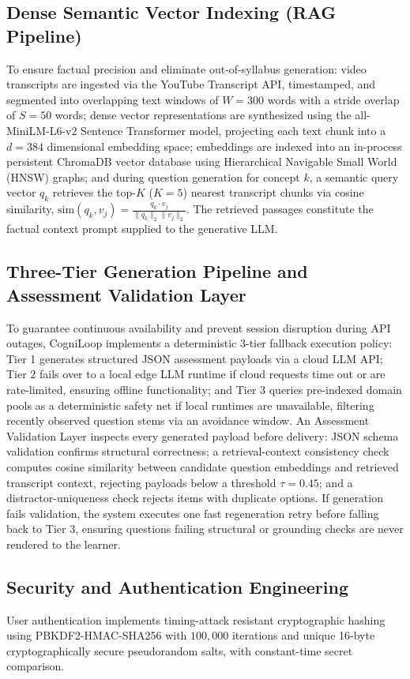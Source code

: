 \documentclass[notitlepage,12pt]{jedm}
\begin{document}
\subsection{Dense Semantic Vector Indexing (RAG Pipeline)}
To ensure factual precision and eliminate out-of-syllabus generation: video transcripts are ingested via the YouTube Transcript API, timestamped, and segmented into overlapping text windows of $W=300$ words with a stride overlap of $S=50$ words; dense vector representations are synthesized using the all-MiniLM-L6-v2 Sentence Transformer model, projecting each text chunk into a $d=384$ dimensional embedding space; embeddings are indexed into an in-process persistent ChromaDB vector database using Hierarchical Navigable Small World (HNSW) graphs; and during question generation for concept $k$, a semantic query vector $q_k$ retrieves the top-$K$ ($K=5$) nearest transcript chunks via cosine similarity, $\text{sim}(q_k, v_j) = \frac{q_k \cdot v_j}{\|q_k\|_2 \|v_j\|_2}$. The retrieved passages constitute the factual context prompt supplied to the generative LLM.

\subsection{Three-Tier Generation Pipeline and Assessment Validation Layer}
To guarantee continuous availability and prevent session disruption during API outages, CogniLoop implements a deterministic 3-tier fallback execution policy: Tier 1 generates structured JSON assessment payloads via a cloud LLM API; Tier 2 fails over to a local edge LLM runtime if cloud requests time out or are rate-limited, ensuring offline functionality; and Tier 3 queries pre-indexed domain pools as a deterministic safety net if local runtimes are unavailable, filtering recently observed question stems via an avoidance window. An Assessment Validation Layer inspects every generated payload before delivery: JSON schema validation confirms structural correctness; a retrieval-context consistency check computes cosine similarity between candidate question embeddings and retrieved transcript context, rejecting payloads below a threshold $\tau=0.45$; and a distractor-uniqueness check rejects items with duplicate options. If generation fails validation, the system executes one fast regeneration retry before falling back to Tier 3, ensuring questions failing structural or grounding checks are never rendered to the learner.

\subsection{Security and Authentication Engineering}
User authentication implements timing-attack resistant cryptographic hashing using PBKDF2-HMAC-SHA256 with $100{,}000$ iterations and unique 16-byte cryptographically secure pseudorandom salts, with constant-time secret comparison.
\end{document}
